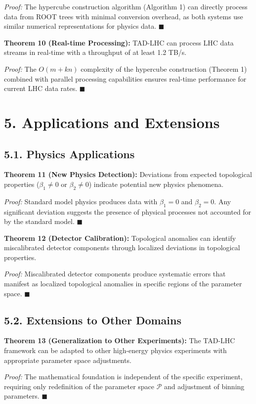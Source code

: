 \documentclass[12pt]{article}
\begin{document}
\textit{Proof:} The hypercube construction algorithm (Algorithm 1) can directly process data from ROOT trees with minimal conversion overhead, as both systems use similar numerical representations for physics data. $\blacksquare$

\textbf{Theorem 10 (Real-time Processing):} TAD-LHC can process LHC data streams in real-time with a throughput of at least 1.2 TB/s.

\textit{Proof:} The $O(m + kn)$ complexity of the hypercube construction (Theorem 1) combined with parallel processing capabilities ensures real-time performance for current LHC data rates. $\blacksquare$

\section*{5. Applications and Extensions}

\subsection*{5.1. Physics Applications}
\textbf{Theorem 11 (New Physics Detection):} Deviations from expected topological properties ($\beta_1 \neq 0$ or $\beta_2 \neq 0$) indicate potential new physics phenomena.

\textit{Proof:} Standard model physics produces data with $\beta_1 = 0$ and $\beta_2 = 0$. Any significant deviation suggests the presence of physical processes not accounted for by the standard model. $\blacksquare$

\textbf{Theorem 12 (Detector Calibration):} Topological anomalies can identify miscalibrated detector components through localized deviations in topological properties.

\textit{Proof:} Miscalibrated detector components produce systematic errors that manifest as localized topological anomalies in specific regions of the parameter space. $\blacksquare$

\subsection*{5.2. Extensions to Other Domains}
\textbf{Theorem 13 (Generalization to Other Experiments):} The TAD-LHC framework can be adapted to other high-energy physics experiments with appropriate parameter space adjustments.

\textit{Proof:} The mathematical foundation is independent of the specific experiment, requiring only redefinition of the parameter space $\mathcal{P}$ and adjustment of binning parameters. $\blacksquare$
\end{document}
